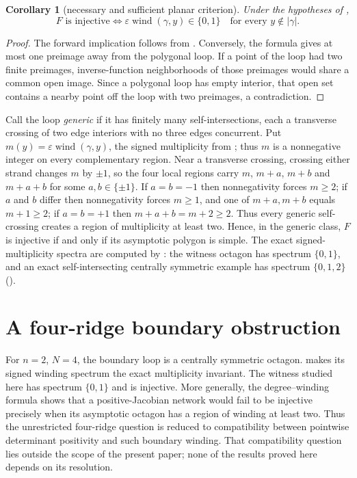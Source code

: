 \documentclass[11pt,twoside,leqno]{article}
\theoremstyle{plain}
\newtheorem{corollary}[corollary]{Corollary}
\theoremstyle{definition}
\theoremstyle{remark}
\newcommand{\wind}{\operatorname{wind}}
\begin{document}
\begin{corollary}[necessary and sufficient planar criterion]\label{cor:iff}
Under the hypotheses of ,
\[
 F\text{ is injective}\iff
 \varepsilon\wind(\gamma,y)\in\{0,1\}
 \quad\text{for every }y\notin|\gamma|.
\]
\end{corollary}
\begin{proof}
The forward implication follows from .  Conversely, the formula gives at most one preimage away from the polygonal loop.  If a point of the loop had two finite preimages, inverse-function neighborhoods of those preimages would share a common open image.  Since a polygonal loop has empty interior, that open set contains a nearby point off the loop with two preimages, a contradiction.
\end{proof}

Call the loop \emph{generic} if it has finitely many self-intersections, each a transverse crossing of two edge interiors with no three edges concurrent.  Put $m(y)=\varepsilon\wind(\gamma,y)$, the signed multiplicity from ; thus $m$ is a nonnegative integer on every complementary region.  Near a transverse crossing, crossing either strand changes $m$ by $\pm1$, so the four local regions carry $m$, $m+a$, $m+b$ and $m+a+b$ for some $a,b\in\{\pm1\}$.  If $a=b=-1$ then nonnegativity forces $m\ge2$; if $a$ and $b$ differ then nonnegativity forces $m\ge1$, and one of $m+a,m+b$ equals $m+1\ge2$; if $a=b=+1$ then $m+a+b=m+2\ge2$.  Thus every generic self-crossing creates a region of multiplicity at least two. Hence, in the generic class, $F$ is injective if and only if its asymptotic polygon is simple.  The exact signed-multiplicity spectra are computed by : the witness octagon has spectrum $\{0,1\}$, and an exact self-intersecting centrally symmetric example has spectrum $\{0,1,2\}$ ().

\section{A four-ridge boundary obstruction}\label{sec:n4}
For $n=2$, $N=4$, the boundary loop is a centrally symmetric octagon.  makes its signed winding spectrum the exact multiplicity invariant. The witness studied here has spectrum $\{0,1\}$ and is injective. More generally, the degree--winding formula shows that a positive-Jacobian network would fail to be injective precisely when its asymptotic octagon has a region of winding at least two. Thus the unrestricted four-ridge question is reduced to compatibility between pointwise determinant positivity and such boundary winding.  That compatibility question lies outside the scope of the present paper; none of the results proved here depends on its resolution.
\end{document}
